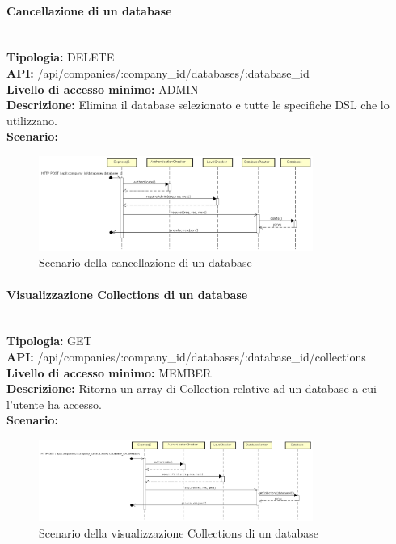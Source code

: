 \newpage
\paragraph{Cancellazione di un database}\mbox{}\\
\textbf{Tipologia:} DELETE \\
\textbf{API:} /api/companies/:company\_id/databases/:database\_id \\
\textbf{Livello di accesso minimo:} ADMIN \\
\textbf{Descrizione:} Elimina il database selezionato e tutte le specifiche DSL che lo utilizzano. \\
\textbf{Scenario:} 
\begin{figure}[H]
\centering
\includegraphics[width=0.8\textwidth]{res/sections/backend/sequence/(DELETE)database.png}
\caption{Scenario della cancellazione di un database}
\end{figure}

\newpage
\paragraph{Visualizzazione Collections di un database} \mbox{}\\
\textbf{Tipologia:} GET \\
\textbf{API:} /api/companies/:company\_id/databases/:database\_id/collections \\
\textbf{Livello di accesso minimo:} MEMBER \\
\textbf{Descrizione:} Ritorna un array di Collection relative ad un database a cui l'utente ha accesso. \\
\textbf{Scenario:} 
\begin{figure}[H]
\centering
\includegraphics[width=0.8\textwidth]{res/sections/backend/sequence/(GET)collection.png}
\caption{Scenario della visualizzazione Collections di un database}
\end{figure}

